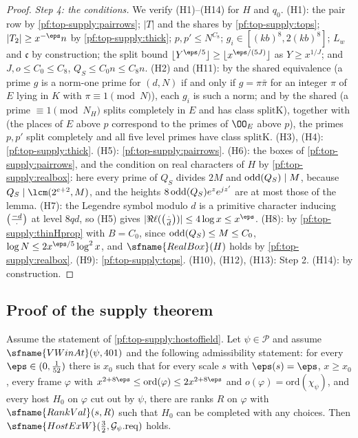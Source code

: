 \begin{proof}
\emph{Step 4: the conditions.} We verify (H1)--(H14) for $H$ and $q_0$.
(H1): the pair row by \cref{pf:top-supply:pairrows}; $|T|$ and the shares by \cref{pf:top-supply:tops}; $|T_2|\ge x^{-\eps}n$ by
\cref{pf:top-supply:thick}; $p,p'\le N^{C_8}$; $g_i\in[(kb)^8,2(kb)^8]$; $L_w$ and $\mathfrak c$ by construction; the split bound
$\lfloor Y^{\eps/5}\rfloor\ge\lfloor x^{\eps/(5J)}\rfloor$ as $Y\ge x^{1/J}$; and $J,o\le C_0\le C_8$, $Q_S\le C_0n\le C_8n$.
(H2) and (H11): by the shared equivalence  (a prime $g$ is a norm-one prime for
$(d,N)$ if and only if $g=\pi\bar\pi$ for an integer $\pi$ of $E$ lying in $K$ with $\pi\equiv1\pmod N$), each $g_i$ is such a norm;
and by the shared  (a prime $\equiv1\pmod{N_H}$ splits completely in $E$ and has
class $\mathrm{splitK}$), together with  (the places of $E$ above $p$
correspond to the primes of $\OO_E$ above $p$), the primes $p,p'$ split completely and all five level primes have class
$\mathrm{splitK}$. (H3), (H4): \cref{pf:top-supply:thick}. (H5): \cref{pf:top-supply:pairrows}. (H6): the boxes of
\cref{pf:top-supply:pairrows}, and the condition on real characters of $H$ by \cref{pf:top-supply:realbox}: here every prime of
$Q_S$ divides $2M$ and $\operatorname{odd}(Q_S)\mid M$, because $Q_S\mid\lcm(2^{e+2},M)$, and the heights
$8\operatorname{odd}(Q_S)e^ze^{jz'}$ are at most those of the lemma. (H7): the Legendre symbol modulo $d$ is a primitive character
inducing $\left(\frac{-d}{\cdot}\right)$ at level $8qd$, so (H5) gives $|\Re\ell(\topsupplyJ{\cdot}d)|\le4\log x\le x^\eps$. (H8): by
\cref{pf:top-supply:thinHprop} with $B=C_0$, since $\operatorname{odd}(Q_S)\le M\le C_0$, $\log N\le2x^{\eps/5}\log^2x$, and
$\sfname{RealBox}(H)$ holds by \cref{pf:top-supply:realbox}. (H9): \cref{pf:top-supply:tops}. (H10), (H12), (H13): Step 2.
(H14): by construction.
\end{proof}

\subsection{Proof of the supply theorem}\label{sec:pf:top-supply:proofs}

\begin{proposition}\label{pf:top-supply:supplyofadmof}
Assume the statement of \cref{pf:top-supply:hostoffield}. Let $\psi\in\mathcal P$ and assume $\sfname{VWinAt}(\psi,401)$ and the
following admissibility statement: for every $\eps\in(0,\frac1{52})$ there is $x_0$ such that for every scale $s$ with
$\eps(s)=\eps$, $x\ge x_0$, every frame $\varphi$ with $x^{2+8\eps}\le\mathrm{ord}(\varphi)\le2x^{2+8\eps}$ and
$o(\varphi)=\mathrm{ord}(\chi_\psi)$, and every host $H_0$ on $\varphi$ cut out by $\psi$, there are ranks $R$ on $\varphi$ with
$\sfname{RankVal}(s,R)$ such that $H_0$ can be completed with any choices. Then
$\sfname{HostExW}(\frac32,\mathcal G_\psi.\mathrm{req})$ holds.
  
\end{proposition}

